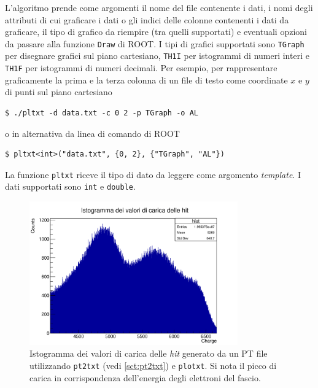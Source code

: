 \documentclass[../main.tex]{subfiles}
\begin{document}
L'algoritmo prende come argomenti il nome del file contenente i dati, i nomi degli attributi di cui graficare i dati o gli indici delle colonne contenenti i dati da graficare, il tipo di grafico da riempire (tra quelli supportati) e eventuali opzioni da passare alla funzione \texttt{Draw} di ROOT. I tipi di grafici supportati sono \texttt{TGraph} per disegnare grafici sul piano cartesiano, \texttt{TH1I} per istogrammi di numeri interi e \texttt{TH1F} per istogrammi di numeri decimali.
Per esempio, per rappresentare graficamente la prima e la terza colonna di un file di testo come coordinate $x$ e $y$ di punti sul piano cartesiano
\begin{lstlisting}[frame=none]
$ ./pltxt -d data.txt -c 0 2 -p TGraph -o AL
\end{lstlisting}
o in alternativa da linea di comando di ROOT
\begin{lstlisting}[frame=none]
$ pltxt<int>("data.txt", {0, 2}, {"TGraph", "AL"})
\end{lstlisting}
La funzione \texttt{pltxt} riceve il tipo di dato da leggere come argomento \emph{template}. I dati supportati sono \texttt{int} e \texttt{double}. 

\begin{figure}[tb]
	\centering
	\includegraphics[width=0.8\textwidth]{c1-1.png}
    \caption{Istogramma dei valori di carica delle \emph{hit} generato da un PT file utilizzando \texttt{pt2txt} (vedi \autoref{sct:pt2txt}) e \texttt{plotxt}. Si nota il picco di carica in corrispondenza dell'energia degli elettroni del fascio.}
	\label{fig:histo}
\end{figure}
\end{document}
